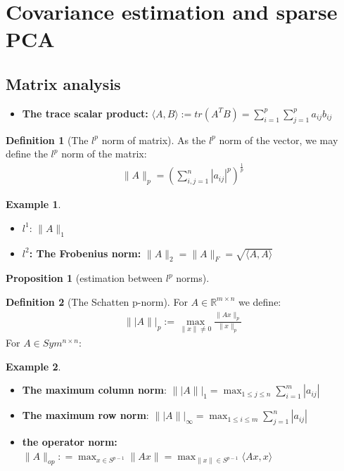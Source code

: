 \documentclass[a4paper,12pt, oneside, fleqn]{book}
\newtheorem{proposition}[theorem]{Proposition}
\theoremstyle{definition}
\newtheorem{definition}{Definition}[section]
\newtheorem*{example}{Example}
\theoremstyle{remark}
\begin{document}
\newpage
\section{Covariance estimation and sparse PCA}
\subsection*{Matrix analysis}
\begin{itemize}
	\item \textbf{The trace scalar product:} $\langle A, B \rangle := tr(A^T B) = \sum_{i = 1}^p \sum_{j = 1}^p a_{ij} b_{ij}$
\end{itemize}

\begin{definition}[The $l^p$ norm of matrix]
	As the $l^p$ norm of the vector, we may define the $l^p$ norm of the matrix:
	\begin{align*}
		\|A\|_p = (\sum_{i, j = 1}^n |a_{ij}|^p)^{\frac{1}{p}}
	\end{align*}
\end{definition}
\begin{example}\quad
\begin{itemize}
	\item $l^1$: $\|A\|_1$
	\item \textbf{$l^2$: The Frobenius norm:} $\|A\|_2 = \|A\|_F = \sqrt{\langle A, A \rangle}$
\end{itemize}	
\end{example}

\begin{proposition}[estimation between $l^p$ norms]
\end{proposition}


\begin{definition}[The Schatten p-norm]
	For $A \in \mathbb{R}^{m \times n}$ we define:
	\begin{align*}
		\||A\||_p := \max_{\|x\| \neq 0} \frac{\|Ax\|_p}{\|x\|_p}
	\end{align*}
	For $A \in Sym^{n \times n}$:
 
\end{definition}
\begin{example}\quad
\begin{itemize}
	\item \textbf{The maximum column norm}: $\||A\||_1 = \max_{1 \le j \le n } \sum_{i = 1}^m  |a_{ij}|$
	\item \textbf{The maximum row norm}: $\||A\||_\infty = \max_{1 \le i \le m} \sum_{j =1}^n |a_{ij}|$
	\item \textbf{the operator norm:} $\|A\|_{op}: = \max_{x \in S^{p-1}} \|Ax\|= \max_{\|x\|\in S^{p-1} }\langle A x, x\rangle$
\end{itemize}	
\end{example}
\end{document}
